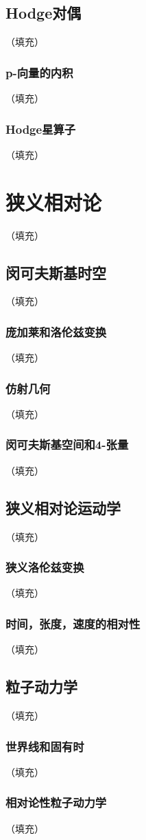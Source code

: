 \documentclass[hyperref,UTF8]{ctexbook}
\begin{document}
\section{Hodge对偶}（填充）
\subsection{p-向量的内积}（填充）
\subsection{Hodge星算子}（填充）
\chapter{狭义相对论}（填充）
\section{闵可夫斯基时空}（填充）
\subsection{庞加莱和洛伦兹变换}（填充）
\subsection{仿射几何}（填充）
\subsection{闵可夫斯基空间和4-张量}（填充）
\section{狭义相对论运动学}（填充）
\subsection{狭义洛伦兹变换}（填充）
\subsection{时间，张度，速度的相对性}（填充）
\section{粒子动力学}（填充）
\subsection{世界线和固有时}（填充）
\subsection{相对论性粒子动力学}（填充）
\end{document}
